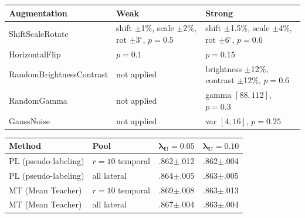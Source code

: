\documentclass[a4paper,fleqn]{cas-dc}
\begin{document}
\noindent
\renewcommand{\thetable}{S1}%
\addtocounter{table}{-1}%
\label{tab:augmentations}%
\begin{center}
\footnotesize
\begin{tabular}{@{}p{}p{}p{}@{}}
\toprule
\textbf{Augmentation} & \textbf{Weak} & \textbf{Strong} \\
\midrule
ShiftScaleRotate          & shift $\pm$1\%, scale $\pm$2\%, rot $\pm$3$^\circ$, $p{=}0.5$  & shift $\pm$1.5\%, scale $\pm$4\%, rot $\pm$6$^\circ$, $p{=}0.6$ \\
HorizontalFlip            & $p{=}0.1$                                                       & $p{=}0.15$ \\
RandomBrightnessContrast  & not applied                                                     & brightness $\pm$12\%, contrast $\pm$12\%, $p{=}0.6$ \\
RandomGamma               & not applied                                                     & gamma $[88, 112]$, $p{=}0.3$ \\
GaussNoise                & not applied                                                     & var $[4, 16]$, $p{=}0.25$ \\
\bottomrule
\end{tabular}
\end{center}

\medskip

\noindent
\renewcommand{\thetable}{S2}%
\addtocounter{table}{-1}%
\label{tab:lambda_ablation}%
\begin{center}
\footnotesize
\begin{tabular}{@{}llcc@{}}
\toprule
\textbf{Method} & \textbf{Pool} & $\boldsymbol{\lambda_U = 0.05}$ & $\boldsymbol{\lambda_U = 0.10}$ \\
\midrule
PL (pseudo-labeling) & $r = 10$ temporal   & .862$\pm$.012 & .862$\pm$.004 \\
PL (pseudo-labeling) & all lateral         & .864$\pm$.005 & .863$\pm$.005 \\
MT (Mean Teacher)    & $r = 10$ temporal   & .869$\pm$.008 & .863$\pm$.013 \\
MT (Mean Teacher)    & all lateral         & .867$\pm$.004 & .863$\pm$.004 \\
\bottomrule
\end{tabular}
\end{center}
\end{document}
